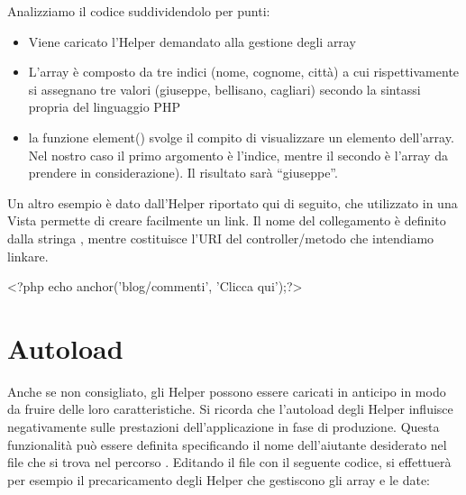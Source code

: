 
Analizziamo il codice suddividendolo per punti:

\begin{itemize}
\item Viene caricato l'Helper demandato alla gestione degli array
\item L'array è composto da tre indici (nome, cognome, città) a cui rispettivamente si assegnano tre valori (giuseppe, bellisano, cagliari) secondo la sintassi propria del linguaggio \ac{PHP}
\item la funzione element() svolge il compito di visualizzare un elemento dell'array. Nel nostro caso il primo argomento è l'indice, mentre il secondo è l'array da prendere in considerazione). Il risultato sarà ``giuseppe''.
\end{itemize}

Un altro esempio è dato dall'Helper  riportato qui di seguito, che utilizzato in una Vista permette di creare facilmente un link. Il nome del collegamento è definito dalla stringa , mentre  costituisce l'\ac{URI} del controller/metodo che intendiamo linkare.

\begin{code}
<?php echo anchor('blog/commenti', 'Clicca qui');?>
\end{code}

\section*{Autoload}
Anche se non consigliato, gli Helper possono essere caricati in anticipo in modo da fruire delle loro caratteristiche. Si ricorda che l'autoload degli Helper influisce negativamente sulle prestazioni dell'applicazione in fase di produzione. Questa funzionalità può essere definita specificando il nome dell'aiutante desiderato nel file  che si trova nel percorso . Editando il file  con il seguente codice, si effettuerà per esempio il precaricamento degli Helper che gestiscono gli array e le date:

